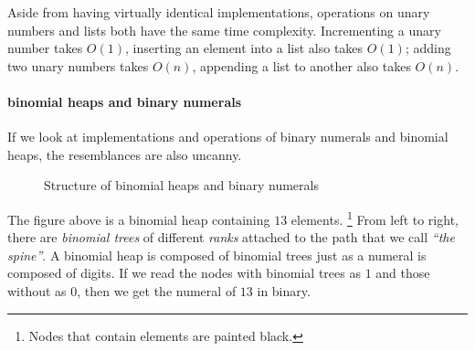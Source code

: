 \documentclass[\main/thesis.tex]{subfiles}
\begin{document}
Aside from having virtually identical implementations, operations on unary numbers
and lists both have the same time complexity. Incrementing a unary number takes
$ O(1) $, inserting an element into a list also takes $ O(1) $; adding two unary
numbers takes $ O(n) $, appending a list to another also takes $ O(n) $.

\paragraph{binomial heaps and binary numerals}

If we look at implementations and operations of binary numerals and binomial
heaps, the resemblances are also uncanny.

\begin{figure}[H]
    \centering
\caption{Structure of binomial heaps and binary numerals}
\label{figure:3}
\end{figure}

The figure above is a binomial heap containing $ 13 $ elements.
\footnote{Nodes that contain elements are painted black.}
From left to right, there are \textit{binomial trees} of different \textit{ranks}
attached to the path that we call \textit{``the spine''}.
A binomial heap is composed of binomial trees just as a numeral is composed
of digits. If we read the nodes with binomial trees as $ 1 $ and those without
as $ 0 $, then we get the numeral of $ 13 $ in binary.
\end{document}

